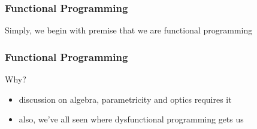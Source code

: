 \begin{frame}[fragile]
\frametitle{Functional Programming}
\begin{center}
Simply, we begin with premise that we are functional programming
\end{center}
\end{frame}

\begin{frame}[fragile]
\frametitle{Functional Programming}
\begin{center}{}
Why?
\end{center}
\begin{itemize}
\item<1-> discussion on algebra, parametricity and optics requires it
\item<2-> also, we've all seen where dysfunctional programming gets us
\end{itemize}
\end{frame}
